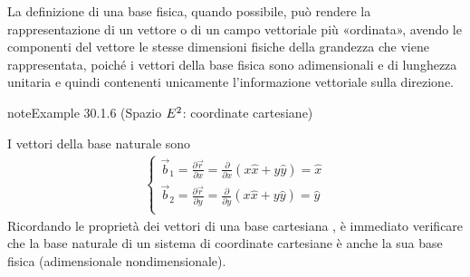 \documentclass[letterpaper,10pt,italian]{jupyterBook}
\begin{document}
\sphinxAtStartPar
La definizione di una base fisica, quando possibile, può rendere la rappresentazione di un vettore o di un campo vettoriale più «ordinata», avendo le componenti del vettore le stesse dimensioni fisiche della grandezza che viene rappresentata, poiché i vettori della base fisica sono adimensionali e di lunghezza unitaria \sphinxhyphen{}  e quindi contenenti unicamente l’informazione vettoriale sulla direzione.
\label{ch/vector-calculus/geometry:def-cartesian-coords-e2-base}
\begin{sphinxadmonition}{note}{Example 30.1.6 (Spazio \protect\(E^2\protect\): coordinate cartesiane)}



\sphinxAtStartPar
I vettori della base naturale sono
\begin{equation*}
\begin{split}\begin{cases}
  \vec{b}_1 = \frac{\partial \vec{r}}{\partial x} = \frac{\partial }{\partial x} \left( x \hat{x} + y \hat{y} \right) = \hat{x} \\
  \vec{b}_2 = \frac{\partial \vec{r}}{\partial y} = \frac{\partial }{\partial y} \left( x \hat{x} + y \hat{y} \right) = \hat{y} \\
\end{cases}\end{split}
\end{equation*}
\sphinxAtStartPar
Ricordando le proprietà dei vettori di una base cartesiana  , è immediato verificare che la base naturale di un sistema di coordinate cartesiane è anche la sua base fisica (adimensionale non\sphinxhyphen{}dimensionale).
\end{sphinxadmonition}
\label{ch/vector-calculus/geometry:def-polar-coords-e2-base}
\end{document}
